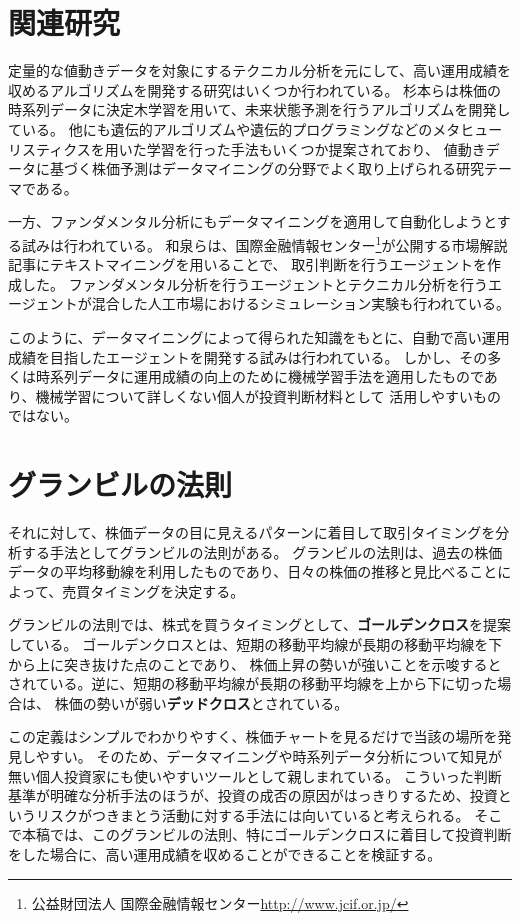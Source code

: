 \documentclass[twocolumn,jsaiac]{jarticle}
\begin{document}
\section{関連研究}
定量的な値動きデータを対象にするテクニカル分析を元にして、高い運用成績を収めるアルゴリズムを開発する研究はいくつか行われている。
杉本らは株価の時系列データに決定木学習を用いて、未来状態予測を行うアルゴリズムを開発している\cite{decisiontree}。
他にも遺伝的アルゴリズムや遺伝的プログラミングなどのメタヒューリスティクスを用いた学習を行った手法もいくつか提案されており\cite{ga, gp}、
値動きデータに基づく株価予測はデータマイニングの分野でよく取り上げられる研究テーマである。

一方、ファンダメンタル分析にもデータマイニングを適用して自動化しようとする試みは行われている。
和泉らは、国際金融情報センター\footnote{公益財団法人 国際金融情報センター\url{http://www.jcif.or.jp/}}が公開する市場解説記事にテキストマイニングを用いることで、
取引判断を行うエージェントを作成した\cite{multiagent}。
ファンダメンタル分析を行うエージェントとテクニカル分析を行うエージェントが混合した人工市場におけるシミュレーション実験も行われている\cite{short}。

このように、データマイニングによって得られた知識をもとに、自動で高い運用成績を目指したエージェントを開発する試みは行われている。
しかし、その多くは時系列データに運用成績の向上のために機械学習手法を適用したものであり、機械学習について詳しくない個人が投資判断材料として
活用しやすいものではない。

\section{グランビルの法則}
それに対して、株価データの目に見えるパターンに着目して取引タイミングを分析する手法としてグランビルの法則がある。
グランビルの法則は、過去の株価データの平均移動線を利用したものであり、日々の株価の推移と見比べることによって、売買タイミングを決定する\cite{granville}。

グランビルの法則では、株式を買うタイミングとして、{\bf ゴールデンクロス}を提案している。
ゴールデンクロスとは、短期の移動平均線が長期の移動平均線を下から上に突き抜けた点のことであり、
株価上昇の勢いが強いことを示唆するとされている。逆に、短期の移動平均線が長期の移動平均線を上から下に切った場合は、
株価の勢いが弱い{\bf デッドクロス}とされている\cite{goldencross}。

この定義はシンプルでわかりやすく、株価チャートを見るだけで当該の場所を発見しやすい。
そのため、データマイニングや時系列データ分析について知見が無い個人投資家にも使いやすいツールとして親しまれている。
こういった判断基準が明確な分析手法のほうが、投資の成否の原因がはっきりするため、投資というリスクがつきまとう活動に対する手法には向いていると考えられる。
そこで本稿では、このグランビルの法則、特にゴールデンクロスに着目して投資判断をした場合に、高い運用成績を収めることができることを検証する。
\end{document}
